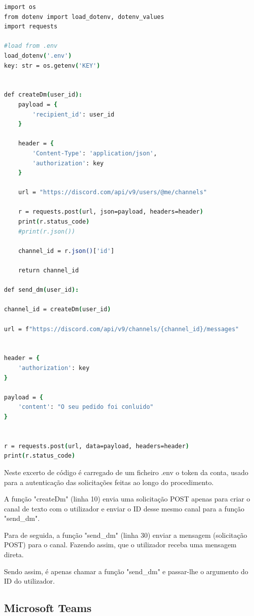 \begin{lstlisting}[language=csh, caption={Envio de notificação via Discord}]
import os
from dotenv import load_dotenv, dotenv_values
import requests

#load from .env
load_dotenv('.env')
key: str = os.getenv('KEY')


def createDm(user_id):
    payload = {
        'recipient_id': user_id
    }
    
    header = {
        'Content-Type': 'application/json',
        'authorization': key
    }

    url = "https://discord.com/api/v9/users/@me/channels"
    
    r = requests.post(url, json=payload, headers=header)
    print(r.status_code)
    #print(r.json())

    channel_id = r.json()['id']
    
    return channel_id

def send_dm(user_id):

channel_id = createDm(user_id)

url = f"https://discord.com/api/v9/channels/{channel_id}/messages"


header = {  
    'authorization': key
}

payload = {
    'content': "O seu pedido foi conluido"
}


r = requests.post(url, data=payload, headers=header)
print(r.status_code)
\end{lstlisting}

Neste excerto de código é carregado de um ficheiro .env o token da conta, usado para
a autenticação das solicitações feitas ao longo do procedimento.

A função "createDm" (linha 10) envia uma solicitação POST apenas para criar o canal de texto
com o utilizador e enviar o ID desse mesmo canal para a função "send\_dm".

Para de seguida, a função "send\_dm" (linha 30) enviar a mensagem (solicitação POST) para 
o canal. Fazendo assim, que o utilizador receba uma mensagem direta.

Sendo assim, é apenas chamar a função "send\_dm" e passar-lhe o argumento do ID do utilizador. \\




\subsection{Microsoft Teams}

